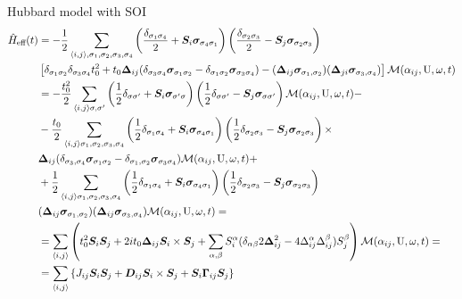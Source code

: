 \begin{section}{Hubbard model with SOI}
\begin{align*}
\hat{H}_{\text{eff}}(t) &= - \frac{1}{2} \sum_{\langle i,j \rangle, \sigma_1, \sigma_2, \sigma_3, \sigma_4} \left( \frac{\delta_{\sigma_1 \sigma_4}}{2} + \boldsymbol{S}_i\boldsymbol{\sigma}_{\sigma_4 \sigma_1} \right) \left( \frac{\delta_{\sigma_2 \sigma_3}}{2} - \boldsymbol{S}_j\boldsymbol{\sigma}_{\sigma_2 \sigma_3} \right) \nonumber \\ &\left[ \delta_{\sigma_1 \sigma_2}\delta_{\sigma_3 \sigma_4}t_0^2 + t_0\boldsymbol{\Delta}_{ij}(\delta_{\sigma_3 \sigma_4} \boldsymbol{\sigma}_{\sigma_1 \sigma_2} - \delta_{\sigma_1 \sigma_2} \boldsymbol{\sigma}_{\sigma_3 \sigma_4}) - (\boldsymbol{\Delta}_{ij}\boldsymbol{\sigma}_{\sigma_1, \sigma_2})(\boldsymbol{\Delta}_{ji}\boldsymbol{\sigma}_{\sigma_3, \sigma_4}) \right] \mathcal{M}(\alpha_{ij}, \text{U}, \omega, t) \\
&= -\frac{t_0^2}{2} \sum_{\langle i,j \rangle \sigma, \sigma'} \left(\frac{1}{2}\delta_{\sigma \sigma'} + \boldsymbol{S}_i\boldsymbol{\sigma}_{\sigma' \sigma}\right)\left(\frac{1}{2}\delta_{\sigma \sigma'}-\boldsymbol{S}_j\boldsymbol{\sigma}_{\sigma \sigma'}\right)\mathcal{M}(\alpha_{ij}, \text{U}, \omega, t) - \\
&- \frac{t_0}{2} \sum_{\langle i,j \rangle \sigma_1, \sigma_2, \sigma_3, \sigma_4} \left(\frac{1}{2}\delta_{\sigma_1 \sigma_4} + \boldsymbol{S}_i\boldsymbol{\sigma}_{\sigma_4 \sigma_1}\right)\left(\frac{1}{2}\delta_{\sigma_2 \sigma_3}-\boldsymbol{S}_j\boldsymbol{\sigma}_{\sigma_2 \sigma_3}\right) \times \\
&\boldsymbol{\Delta}_{ij}(\delta_{\sigma_3,\sigma_4}\boldsymbol{\sigma}_{\sigma_1 \sigma_2}-\delta_{\sigma_1,\sigma_2}\boldsymbol{\sigma}_{\sigma_3 \sigma_4})\mathcal{M}(\alpha_{ij}, \text{U}, \omega, t) + \\
&+\frac{1}{2}\sum_{\langle i,j \rangle \sigma_1, \sigma_2, \sigma_3, \sigma_4} \left(\frac{1}{2}\delta_{\sigma_1 \sigma_4} + \boldsymbol{S}_i\boldsymbol{\sigma}_{\sigma_4 \sigma_1}\right)\left(\frac{1}{2}\delta_{\sigma_2 \sigma_3}-\boldsymbol{S}_j\boldsymbol{\sigma}_{\sigma_2 \sigma_3}\right) \\
&(\boldsymbol{\Delta}_{ij}\boldsymbol{\sigma}_{\sigma_1, \sigma_2})(\boldsymbol{\Delta}_{ij}\boldsymbol{\sigma}_{\sigma_3, \sigma_4})\mathcal{M}(\alpha_{ij}, \text{U}, \omega, t) = \\
&= \sum_{\langle i,j \rangle} \left( t_0^2 \boldsymbol{S}_i\boldsymbol{S}_j + 2it_0\boldsymbol{\Delta}_{ij} \boldsymbol{S}_i \times \boldsymbol{S}_j + \sum_{\alpha, \beta} S_i^\alpha (\delta_{\alpha \beta} 2\boldsymbol{\Delta}_{ij}^2 - 4\Delta_{ij}^\alpha\Delta_{ij}^\beta ) S_j^\beta \right) \mathcal{M}(\alpha_{ij}, \text{U}, \omega, t) =\\
&= \sum_{\langle i,j \rangle} \left\{ J_{ij}\boldsymbol{S}_i\boldsymbol{S}_j +\boldsymbol{D}_{ij}\boldsymbol{S}_i \times \boldsymbol{S}_j + \boldsymbol{S}_i\boldsymbol{\Gamma}_{ij}\boldsymbol{S}_j \right\}
\end{align*}


\end{section}

